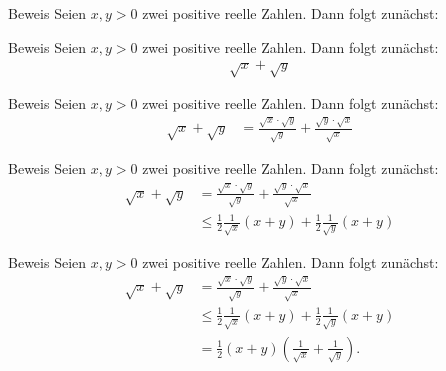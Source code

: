 \documentclass[10pt]{beamer}
\begin{document}
\begin{frame}{Beweis}
    Seien \( x, y > 0 \) zwei positive reelle Zahlen. Dann folgt zunächst:
\end{frame}



\begin{frame}{Beweis}
    Seien \( x, y > 0 \) zwei positive reelle Zahlen. Dann folgt zunächst:
    \begin{align*}
        \sqrt{x} + \sqrt{y}
    \end{align*}
\end{frame}



\begin{frame}{Beweis}
    Seien \( x, y > 0 \) zwei positive reelle Zahlen. Dann folgt zunächst:
    \begin{align*}
        \sqrt{x} + \sqrt{y}
        & = \frac{\sqrt{x} \cdot \sqrt{y}}{\sqrt{y}} + \frac{\sqrt{y} \cdot \sqrt{x}}{\sqrt{x}}
    \end{align*}
\end{frame}



\begin{frame}{Beweis}
    Seien \( x, y > 0 \) zwei positive reelle Zahlen. Dann folgt zunächst:
    \begin{align*}
        \sqrt{x} + \sqrt{y}
        & = \frac{\sqrt{x} \cdot \sqrt{y}}{\sqrt{y}} + \frac{\sqrt{y} \cdot \sqrt{x}}{\sqrt{x}} \\
        & \leq \frac{1}{2}\frac{1}{\sqrt{x}}\left( x + y \right) + \frac{1}{2}\frac{1}{\sqrt{y}} \left( x + y \right)
    \end{align*}
\end{frame}



\begin{frame}{Beweis}
    Seien \( x, y > 0 \) zwei positive reelle Zahlen. Dann folgt zunächst:
    \begin{align*}
        \sqrt{x} + \sqrt{y}
        & = \frac{\sqrt{x} \cdot \sqrt{y}}{\sqrt{y}} + \frac{\sqrt{y} \cdot \sqrt{x}}{\sqrt{x}} \\
        & \leq \frac{1}{2}\frac{1}{\sqrt{x}}\left( x + y \right) + \frac{1}{2}\frac{1}{\sqrt{y}} \left( x + y \right) \\
        & = \frac{1}{2} \left( x + y \right) \left( \frac{1}{\sqrt{x}} + \frac{1}{\sqrt{y}} \right).
    \end{align*}
\end{frame}
\end{document}
